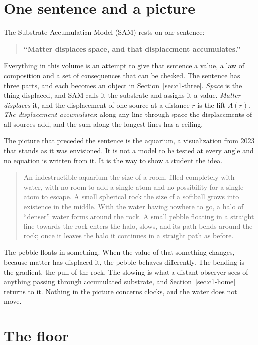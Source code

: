 

\section{One sentence and a picture}
\label{sec:c1-sentence}

The Substrate Accumulation Model (SAM) rests on one sentence:
\begin{quote}
\textbf{``Matter displaces space, and that displacement accumulates.''}
\end{quote}
Everything in this volume is an attempt to give that sentence a value, a law of composition and a set of consequences that can be checked. The sentence has three parts, and each becomes an object in Section~\ref{sec:c1-three}. \emph{Space} is the thing displaced, and SAM calls it the substrate and assigns it a value. \emph{Matter displaces} it, and the displacement of one source at a distance $r$ is the lift $A(r)$. \emph{The displacement accumulates}: along any line through space the displacements of all sources add, and the sum along the longest lines has a ceiling.

The picture that preceded the sentence is the aquarium, a visualization from 2023 that stands as it was envisioned. It is not a model to be tested at every angle and no equation is written from it. It is the way to show a student the idea.
\begin{quote}
An indestructible aquarium the size of a room, filled completely with water, with no room to add a single atom and no possibility for a single atom to escape. A small spherical rock the size of a softball grows into existence in the middle. With the water having nowhere to go, a halo of ``denser'' water forms around the rock. A small pebble floating in a straight line towards the rock enters the halo, slows, and its path bends around the rock; once it leaves the halo it continues in a straight path as before.
\end{quote}
The pebble floats in something. When the value of that something changes, because matter has displaced it, the pebble behaves differently. The bending is the gradient, the pull of the rock. The slowing is what a distant observer sees of anything passing through accumulated substrate, and Section~\ref{sec:c1-home} returns to it. Nothing in the picture concerns clocks, and the water does not move.

\section{The floor}
\label{sec:c1-floor}

